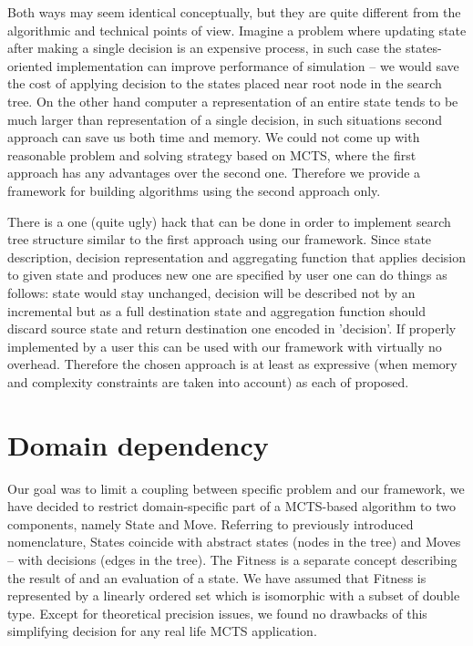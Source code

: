 Both ways may seem identical conceptually, but they are quite different from
the algorithmic and technical points of view.
Imagine a problem where updating state after making a single decision is an
expensive process, in such case the states-oriented implementation can improve
performance of simulation -- we would save the cost of applying decision to the
states placed near root node in the search tree.
On the other hand computer a representation of an entire state tends to be much
larger than representation of a single decision, in such situations second
approach can save us both time and memory.
We could not come up with reasonable problem and solving strategy based on
MCTS, where the first approach has any advantages over the second one. Therefore we
provide a framework for building algorithms using the second approach only.

There is a one (quite ugly) hack that can be done in order to implement search
tree structure similar to the first approach using our framework. Since state
description, decision representation and aggregating function that applies
decision to given state and produces new one are specified by user one can do
things as follows: state would stay unchanged, decision will be described not
by an incremental but as a full destination state and aggregation function
should discard source state and return destination one encoded in 'decision'.
If properly implemented by a user this can be used with our framework with
virtually no overhead. Therefore the chosen approach is at least as expressive
(when memory and complexity constraints are taken into account) as each of
proposed.

\section{Domain dependency}
Our goal was to limit a coupling between specific problem and our framework, we
have decided to restrict domain-specific part of a MCTS-based algorithm to two
components, namely State and Move. Referring to previously introduced
nomenclature, States coincide with abstract states (nodes in the tree) and
Moves -- with decisions (edges in the tree).
The Fitness is a separate concept describing the result of and an evaluation of a
state. We have assumed that Fitness is represented by a linearly ordered set
which is isomorphic with a subset of double type. Except for theoretical
precision issues, we found no drawbacks of this simplifying decision for any
real life MCTS application.

